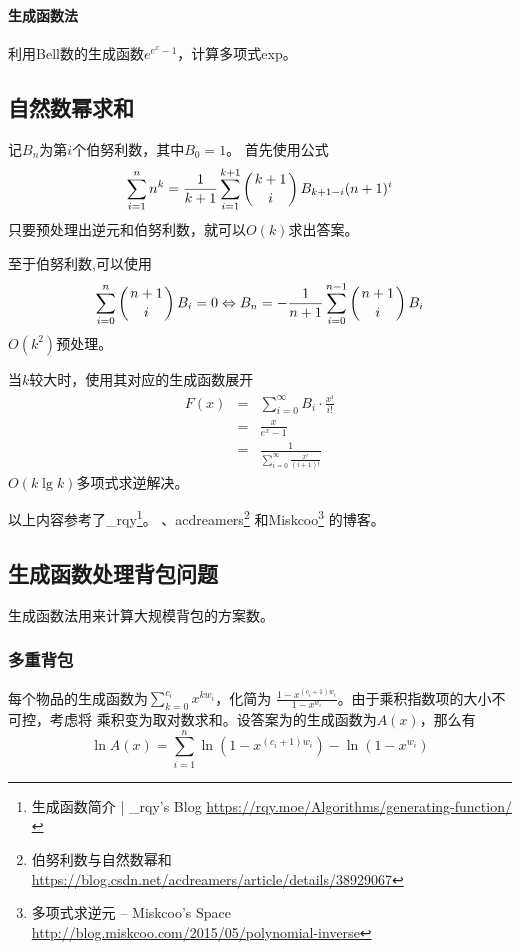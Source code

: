 \paragraph{生成函数法}
利用Bell数的生成函数$e^{e^x-1}$，计算多项式exp。
\subsection{自然数幂求和}

记$B_n$为第$i$个伯努利数，其中$B_0=1$。
首先使用公式
\begin{displaymath}
	\sum_{i=1}^n{n^k}=\frac{1}{k+1}\sum_{i=1}^{k+1}{\left(k+1 \atop i\right)B_{k+1-i}(n+1)^i}
\end{displaymath}
只要预处理出逆元和伯努利数，就可以$O(k)$求出答案。

至于伯努利数,可以使用
\begin{displaymath}
	\sum_{i=0}^n{\left(n+1 \atop i\right)B_i}=0
	\Leftrightarrow
	B_n=-\frac{1}{n+1}\sum_{i=0}^{n-1}{\left(n+1 \atop i\right)B_i}
\end{displaymath}
$O(k^2)$预处理。

当$k$较大时，使用其对应的生成函数展开
\begin{eqnarray*}
    F(x)&=&\sum_{i=0}^\infty{B_i\cdot\frac{x^i}{i!}}\\
    &=&\frac{x}{e^x-1}\\
	&=&\frac{1}{\displaystyle \sum_{i=0}^\infty{\frac{x^i}{(i+1)!}}}
\end{eqnarray*}
$O(k\lg k)$多项式求逆解决。

以上内容参考了\_rqy\footnote{生成函数简介 | \_rqy's Blog
	\url{https://rqy.moe/Algorithms/generating-function/}
}。
、acdreamers\footnote{伯努利数与自然数幂和
	\url{https://blog.csdn.net/acdreamers/article/details/38929067}
}
和Miskcoo\footnote{多项式求逆元 – Miskcoo's Space
	\url{http://blog.miskcoo.com/2015/05/polynomial-inverse}
}
的博客。
\subsection{生成函数处理背包问题}
生成函数法用来计算大规模背包的方案数。
\subsubsection{多重背包}
每个物品的生成函数为$\displaystyle \sum_{k=0}^{c_i}{x^{kw_i}}$，化简为
$\frac{1-x^{(c_i+1)w_i}}{1-x^{w_i}}$。由于乘积指数项的大小不可控，考虑将
乘积变为取对数求和。设答案为的生成函数为$A(x)$，那么有
\begin{displaymath}
\ln A(x)=\sum_{i=1}^n{\ln(1-x^{(c_i+1)w_i})-\ln (1-x^{w_i})}
\end{displaymath}

